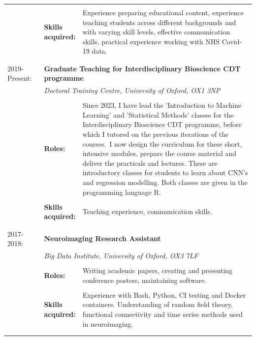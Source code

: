 \documentclass{friggeri-cv}
\begin{document}
\begin{longtable}{p{0.15\linewidth} p{0.1\linewidth} p{0.75\linewidth}}
     & \\
     & \textbf{Skills acquired:} & Experience preparing educational content, experience teaching students across different backgrounds and with varying skill levels, effective communication skills, practical experience working with NHS Covid-19 data. \\
     & \\
     & \\
      2019-Present: & \multicolumn{2}{p{0.85\linewidth}}{\textbf{Graduate Teaching for Interdisciplinary Bioscience CDT programme}} \\
     & \multicolumn{2}{p{0.85\linewidth}}{\textit{Doctoral Training Centre, University of Oxford,  OX1 3NP}} \\
     & \\
     & \textbf{Roles:} & Since 2023, I have lead the 'Introduction to Machine Learning' and 'Statistical Methods' classes for the Interdisciplinary Bioscience CDT programme, before which I tutored on the previous iterations of the courses.~I now design the curriculum for these short, intensive modules, prepare the course material and deliver the practicals and lectures. These are introductory classes for students to learn about CNN’s and regression modelling. Both classes are given in the programming language R.\\
     & \\
     & \textbf{Skills acquired:} & Teaching experience, communication skills. \\
     & \\
     & \\
      2017-2018: & \multicolumn{2}{p{0.85\linewidth}}{\textbf{Neuroimaging Research Assistant}} \\
     & \multicolumn{2}{p{0.85\linewidth}}{\textit{Big Data Institute, University of Oxford, OX3 7LF}} \\
     & \\
     & \textbf{Roles:} & Writing academic papers, creating and presenting conference posters, maintaining software.\\
     & \\
     & \textbf{Skills acquired:} & Experience with Bash, Python, CI testing and Docker containers. Understanding of random field theory, functional connectivity and time series methods used in neuroimaging. \\
     & \\
     & \\
     
\end{longtable}
\end{document}
